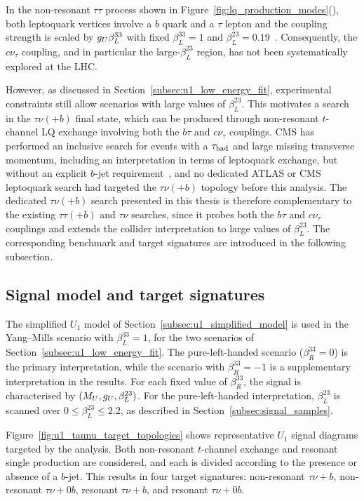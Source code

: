 In the non-resonant $\tau\tau$ process shown in Figure~\ref{fig:lq_production_modes}(), both leptoquark vertices involve a $b$ quark and a $\tau$ lepton and the coupling strength is scaled by $g_U\beta_L^{33}$ with fixed $\beta_L^{33}=1$ and $\beta_L^{23}=0.19$~\cite{CMS2023TauTauLQ}.
Consequently, the $c\nu_{\tau}$ coupling, and in particular the large-$\beta_L^{23}$ region, has not been systematically explored at the LHC.

However, as discussed in Section~\ref{subsec:u1_low_energy_fit}, experimental constraints still allow scenarios with large values of $\beta_L^{23}$.
This motivates a search in the $\tau\nu(+b)$ final state, which can be produced through non-resonant $t$-channel LQ exchange involving both the $b\tau$ and $c\nu_\tau$ couplings. 
CMS has performed an inclusive search for events with a $\tau_{\mathrm{had}}$ and large missing transverse momentum, including an interpretation in terms of leptoquark exchange, but without an explicit $b$-jet requirement~\cite{CMS2023TauNu}, and no dedicated ATLAS or CMS leptoquark search had targeted the $\tau\nu(+b)$ topology before this analysis. The dedicated $\tau\nu(+b)$ search presented in this thesis is therefore complementary to the existing $\tau\tau(+b)$ and $\tau\nu$ searches, since it probes both the $b\tau$ and $c\nu_{\tau}$ couplings and extends the collider interpretation to large values of $\beta_{L}^{23}$. The corresponding benchmark and target signatures are introduced in the following subsection.

\subsection{Signal model and target signatures}
\label{subsec:lq_collider_benchmark}

The simplified $U_{1}$ model of Section~\ref{subsec:u1_simplified_model} is used in the Yang--Mills scenario with $\beta_{L}^{33}=1$, for the two scenarios of Section~\ref{subsec:u1_low_energy_fit}.
The pure-left-handed scenario ($\beta_{R}^{33}=0$) is the primary interpretation, while the scenario with $\beta_{R}^{33}=-1$ is a supplementary interpretation in the results.
For each fixed value of $\beta_{R}^{33}$, the signal is characterised by $(M_U,g_U,\beta_L^{23})$.
For the pure-left-handed interpretation, $\beta_L^{23}$ is scanned over $0\leq\beta_L^{23}\leq2.2$, as described in Section~\ref{subsec:signal_samples}.

Figure~\ref{fig:u1_taunu_target_topologies} shows representative $U_{1}$ signal diagrams targeted by the analysis. Both non-resonant $t$-channel exchange and resonant single production are considered, and each is divided according to the presence or absence of a $b$-jet. This results in four target signatures: non-resonant $\tau\nu+b$, non-resonant $\tau\nu+0b$, resonant $\tau\nu+b$, and resonant $\tau\nu+0b$.

